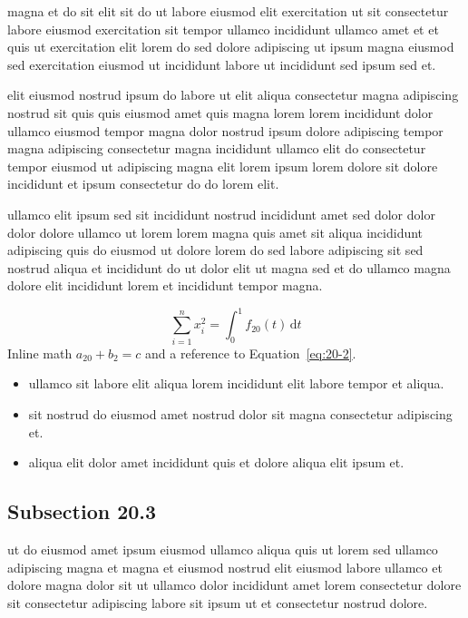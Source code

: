 \documentclass{article}
\begin{document}
magna et do sit elit sit do ut labore eiusmod elit exercitation ut sit consectetur labore eiusmod exercitation sit tempor ullamco incididunt ullamco amet et et quis ut exercitation elit lorem do sed dolore adipiscing ut ipsum magna eiusmod sed exercitation eiusmod ut incididunt labore ut incididunt sed ipsum sed et.

elit eiusmod nostrud ipsum do labore ut elit aliqua consectetur magna adipiscing nostrud sit quis quis eiusmod amet quis magna lorem lorem incididunt dolor ullamco eiusmod tempor magna dolor nostrud ipsum dolore adipiscing tempor magna adipiscing consectetur magna incididunt ullamco elit do consectetur tempor eiusmod ut adipiscing magna elit lorem ipsum lorem dolore sit dolore incididunt et ipsum consectetur do do lorem elit.

ullamco elit ipsum sed sit incididunt nostrud incididunt amet sed dolor dolor dolor dolore ullamco ut lorem lorem magna quis amet sit aliqua incididunt adipiscing quis do eiusmod ut dolore lorem do sed labore adipiscing sit sed nostrud aliqua et incididunt do ut dolor elit ut magna sed et do ullamco magna dolore elit incididunt lorem et incididunt tempor magna.

\begin{equation}\label{eq:20-2}
  \sum_{i=1}^{n} x_i^{2} = \int_0^1 f_{20}(t)\,\mathrm{d}t
\end{equation}
Inline math $a_{20} + b_{2} = c$ and a reference to Equation~\eqref{eq:20-2}.

\begin{itemize}
  \item ullamco sit labore elit aliqua lorem incididunt elit labore tempor et aliqua.
  \item sit nostrud do eiusmod amet nostrud dolor sit magna consectetur adipiscing et.
  \item aliqua elit dolor amet incididunt quis et dolore aliqua elit ipsum et.
\end{itemize}

\subsection{Subsection 20.3}\label{sec:20-3}
ut do eiusmod amet ipsum eiusmod ullamco aliqua quis ut lorem sed ullamco adipiscing magna et magna et eiusmod nostrud elit eiusmod labore ullamco et dolore magna dolor sit ut ullamco dolor incididunt amet lorem consectetur dolore sit consectetur adipiscing labore sit ipsum ut et consectetur nostrud dolore.
\end{document}
